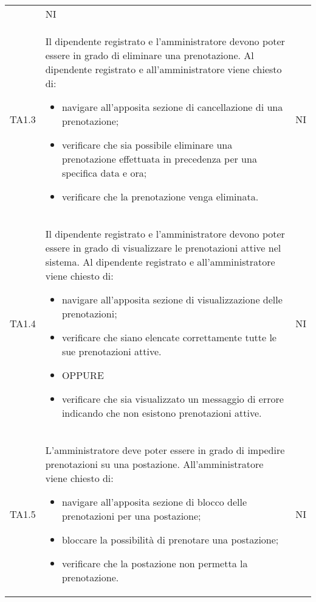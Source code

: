 {\begin{longtable}{ c C{11cm} c }
\begin{itemize}
        \end{itemize}&
        NI\\
        TA1.3&
        Il dipendente registrato e l'amministratore devono poter essere in grado di eliminare una prenotazione.\newline
        Al dipendente registrato e all'amministratore viene chiesto di:
        \begin{itemize}
            \item navigare all'apposita sezione di cancellazione di una prenotazione;
            \item verificare che sia possibile eliminare una prenotazione effettuata in precedenza per una specifica data e ora;
            \item verificare che la prenotazione venga eliminata.
        \end{itemize}&
        NI\\
        TA1.4&
        Il dipendente registrato e l'amministratore devono poter essere in grado di visualizzare le prenotazioni attive nel sistema.\newline
        Al dipendente registrato e all'amministratore viene chiesto di:
        \begin{itemize}
            \item navigare all'apposita sezione di visualizzazione delle prenotazioni;
            \item verificare che siano elencate correttamente tutte le sue prenotazioni attive.
            \item [] OPPURE
            \item verificare che sia visualizzato un messaggio di errore indicando che non esistono prenotazioni attive.
        \end{itemize}&
        NI\\
        TA1.5&
        L'amministratore deve poter essere in grado di impedire prenotazioni su una postazione.\newline
        All'amministratore viene chiesto di:
        \begin{itemize}
            \item navigare all'apposita sezione di blocco delle prenotazioni per una postazione;
            \item bloccare la possibilità di prenotare una postazione;
            \item verificare che la postazione non permetta la prenotazione.
        \end{itemize}&
        NI\\

\end{longtable}}
